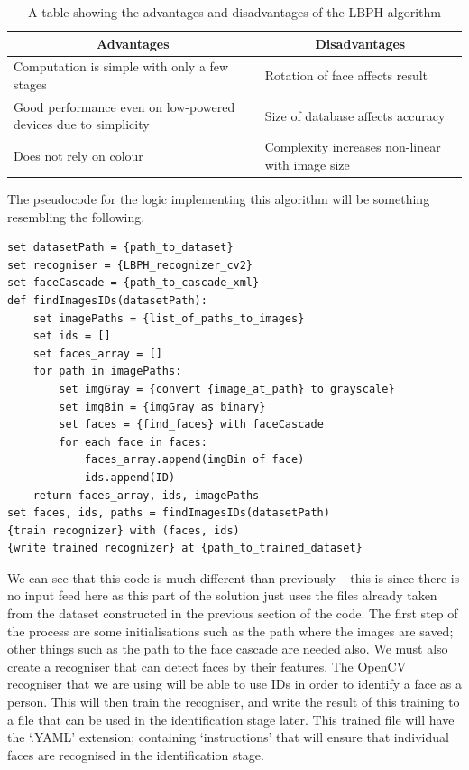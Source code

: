 \documentclass[9pt]{article}
\begin{document}
\begin{table}[H]
	\centering
	\begin{tabular}{@{}p{3in}p{3in}@{}}
		\multicolumn{1}{c}{\textbf{Advantages}}                        & \multicolumn{1}{c}{\textbf{Disadvantages}}        \\ \midrule
		Computation is simple with only a few stages                   & Rotation of face affects result                   \\
		Good performance even on low-powered devices due to simplicity & Size of database affects accuracy                 \\
		Does not rely on colour                                        & Complexity   increases non-linear with image size \\ \bottomrule
	\end{tabular}
	\caption{A table showing the advantages and disadvantages of the LBPH algorithm}
	\label{tab_lbphProCons}
\end{table}
The pseudocode for the logic implementing this algorithm will be something resembling the following.
\begin{lstlisting}
set datasetPath = {path_to_dataset} 
set recogniser = {LBPH_recognizer_cv2}
set faceCascade = {path_to_cascade_xml} 
def findImagesIDs(datasetPath): 
	set imagePaths = {list_of_paths_to_images}
	set ids = [] 
	set faces_array = [] 
	for path in imagePaths: 
		set imgGray = {convert {image_at_path} to grayscale}
		set imgBin = {imgGray as binary}
		set faces = {find_faces} with faceCascade 
		for each face in faces:
			faces_array.append(imgBin of face) 
			ids.append(ID) 
	return faces_array, ids, imagePaths 
set faces, ids, paths = findImagesIDs(datasetPath)
{train recognizer} with (faces, ids) 
{write trained recognizer} at {path_to_trained_dataset}
\end{lstlisting}
We can see that this code is much different than previously – this is since there is no input feed here as this part of the solution just uses the files already taken from the dataset constructed in the previous section of the code.
The first step of the process are some initialisations such as the path where the images are saved; other things such as the path to the face cascade are needed also. We must also create a recogniser that can detect faces by their features. The OpenCV recogniser that we are using will be able to use IDs in order to identify a face as a person. This will then train the recogniser, and write the result of this training to a file that can be used in the identification stage later. This trained file will have the `.YAML' extension; containing `instructions' that will ensure that individual faces are recognised in the identification stage.\\
\end{document}
